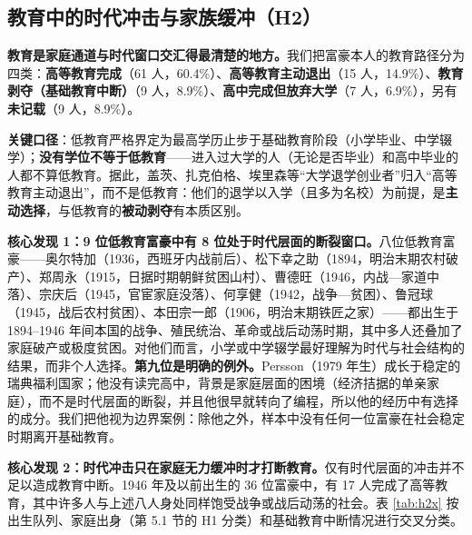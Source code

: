 \documentclass[UTF8,a4paper,11pt]{ctexart}
\begin{document}
\subsection{教育中的时代冲击与家族缓冲（H2）}

\textbf{教育是家庭通道与时代窗口交汇得最清楚的地方。}我们把富豪本人的教育路径分为四类：\textbf{高等教育完成}（61 人，60.4\%）、\textbf{高等教育主动退出}（15 人，14.9\%）、\textbf{教育剥夺（基础教育中断）}（9 人，8.9\%）、\textbf{高中完成但放弃大学}（7 人，6.9\%），另有\textbf{未记载}（9 人，8.9\%）。

\textbf{关键口径}：低教育严格界定为最高学历止步于基础教育阶段（小学毕业、中学辍学）；\textbf{没有学位不等于低教育}——进入过大学的人（无论是否毕业）和高中毕业的人都不算低教育。据此，盖茨、扎克伯格、埃里森等“大学退学创业者”归入“高等教育主动退出”，而不是低教育：他们的退学以入学（且多为名校）为前提，是\textbf{主动选择}，与低教育的\textbf{被动剥夺}有本质区别。

\textbf{核心发现 1：9 位低教育富豪中有 8 位处于时代层面的断裂窗口。}八位低教育富豪——奥尔特加（1936，西班牙内战前后）、松下幸之助（1894，明治末期农村破产）、郑周永（1915，日据时期朝鲜贫困山村）、曹德旺（1946，内战—家道中落）、宗庆后（1945，官宦家庭没落）、何享健（1942，战争—贫困）、鲁冠球（1945，战后农村贫困）、本田宗一郎（1906，明治末期铁匠之家）——都出生于 1894--1946 年间本国的战争、殖民统治、革命或战后动荡时期，其中多人还叠加了家庭破产或极度贫困。对他们而言，小学或中学辍学最好理解为时代与社会结构的结果，而非个人选择。\textbf{第九位是明确的例外。}Persson（1979 年生）成长于稳定的瑞典福利国家；他没有读完高中，背景是家庭层面的困境（经济拮据的单亲家庭），而不是时代层面的断裂，并且他很早就转向了编程，所以他的经历中有选择的成分。我们把他视为边界案例：除他之外，样本中没有任何一位富豪在社会稳定时期离开基础教育。

\textbf{核心发现 2：时代冲击只在家庭无力缓冲时才打断教育。}仅有时代层面的冲击并不足以造成教育中断。1946 年及以前出生的 36 位富豪中，有 17 人完成了高等教育，其中许多人与上述八人身处同样饱受战争或战后动荡的社会。表 \ref{tab:h2x} 按出生队列、家庭出身（第 5.1 节的 H1 分类）和基础教育中断情况进行交叉分类。
\end{document}
